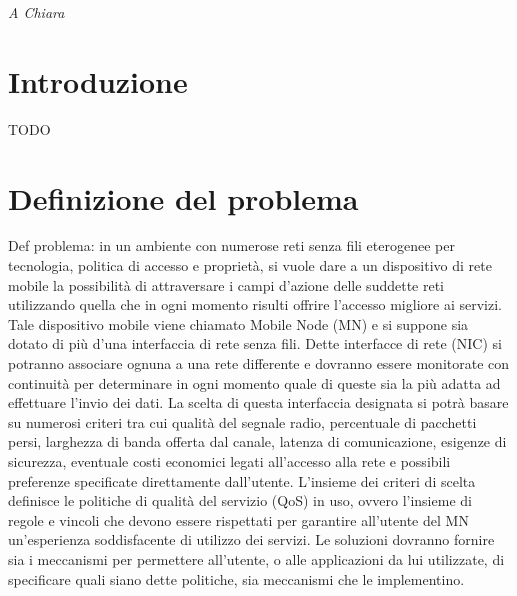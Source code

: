 \documentclass[12pt,a4paper,openright,twoside]{book}
\begin{document}
%
%
\begin{titlepage}
  \thispagestyle{empty}
  \topmargin=6.5cm
  \raggedleft
  \large \em A Chiara
  \newpage
  \clearpage{\pagestyle{empty}\cleardoublepage}
\end{titlepage}



\chapter*{Introduzione}

TODO

\clearpage{\pagestyle{empty}\cleardoublepage}

\tableofcontents
\rhead[\fancyplain{}{\bfseries\leftmark}]{\fancyplain{}{\bfseries\thepage}}
\clearpage{\pagestyle{empty}\cleardoublepage}

\chapter{Definizione del problema}
 Def problema: in un ambiente con numerose reti
senza fili eterogenee per tecnologia, politica di accesso e proprietà,
si vuole dare a un dispositivo di rete mobile la possibilità di
attraversare i campi d'azione delle suddette reti utilizzando quella
che in ogni momento risulti offrire l'accesso migliore ai
servizi. Tale dispositivo mobile viene chiamato Mobile Node (MN) e si
suppone sia dotato di più d'una interfaccia di rete senza fili. Dette
interfacce di rete (NIC) si potranno associare ognuna a una rete
differente e dovranno essere monitorate con continuità per determinare
in ogni momento quale di queste sia la più adatta ad effettuare
l'invio dei dati. La scelta di questa interfaccia designata si potrà
basare su numerosi criteri tra cui qualità del segnale radio,
percentuale di pacchetti persi, larghezza di banda offerta dal canale,
latenza di comunicazione, esigenze di sicurezza, eventuale costi
economici legati all'accesso alla rete e possibili preferenze
specificate direttamente dall'utente. L'insieme dei criteri di scelta
definisce le politiche di qualità del servizio (QoS) in uso, ovvero
l'insieme di regole e vincoli che devono essere rispettati per
garantire all'utente del MN un'esperienza soddisfacente di utilizzo
dei servizi. Le soluzioni dovranno fornire sia i meccanismi per
permettere all'utente, o alle applicazioni da lui utilizzate, di
specificare quali siano dette politiche, sia meccanismi che le
implementino.
\end{document}
